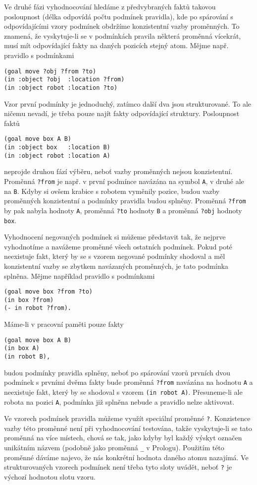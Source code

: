 Ve druhé fázi vyhodnocování hledáme z předvybraných faktů takovou posloupnost
(délka odpovídá počtu podmínek pravidla), kde po spárování s odpovídajícími
vzory podmínek obdržíme konzistentní vazby proměnných. To znamená, že
vyskytuje-li se v podmínkách pravila některá proměnná vícekrát, musí mít
odpovídající fakty na daných pozicích stejný atom.  Mějme např. pravidlo s
podmínkami
\begin{verbatim}
(goal move ?obj ?from ?to)
(in :object ?obj  :location ?from)
(in :object robot :location ?to)
\end{verbatim}
Vzor první podmínky je jednoduchý, zatímco další dva jsou strukturované. To ale
ničemu nevadí, je třeba pouze najít fakty odpovídající struktury. Posloupnost
faktů
\begin{verbatim}
(goal move box A B)
(in :object box   :location B)
(in :object robot :location A)
\end{verbatim}
neprojde druhou fází výběru, neboť vazby proměnných nejsou konzistentní.
Proměnná \verb|?from| je např. v první podmínce navázána na symbol \verb|A|, v
druhé ale na \verb|B|. Kdyby si ovšem krabice s robotem vyměnily pozice, budou
vazby proměnných konzistentní a podmínky pravidla budou splněny. Proměnná
\verb|?from| by pak nabyla hodnoty \verb|A|, proměnná \verb|?to| hodnoty
\verb|B| a proměnná \verb|?obj| hodnoty \verb|box|.

Vyhodnocení negovaných podmínek si můžeme představit tak, že nejprve vyhodnotíme
a navážeme proměnné všech ostatních podmínek. Pokud poté neexistuje fakt, který
by se s vzorem negované podmínky shodoval a měl konzistentní vazby se zbytkem navázaných
proměnných, je tato podmínka splněna. Mějme například pravidlo s podmínkami
\begin{verbatim}
(goal move box ?from ?to)
(in box ?from)
(- in robot ?from).
\end{verbatim}
Máme-li v pracovní paměti pouze fakty
\begin{verbatim}
(goal move box A B)
(in box A)
(in robot B),
\end{verbatim}
budou podmínky pravidla splněny, neboť po spárování vzorů prvních dvou podmínek
s prvními dvěma fakty bude proměnná \verb|?from| navázána na hodnotu \verb|A| a
neexistuje fakt, který by se shodoval s vzorem \verb|(in robot A)|. Přesuneme-li
ale robota na pozici \verb|A|, podmínka již splněna nebude a pravidlo nelze
aktivovat.

Ve vzorech podmínek pravidla můžeme využít speciální proměnné \verb|?|.
Konzistence vazby této proměnné není při vyhodnocování testována, takže
vyskytuje-li se tato proměnná na více místech, chová se tak, jako kdyby byl
každý výskyt označen unikátním názvem (podobně jako proměnná \verb|_| v
Prologu). Použitím této proměnné dáváme najevo, že nás konkrétní hodnota daného
atomu nazajímá. Ve strukturovaných vzorech podmínek není třeba tyto sloty uvádět,
neboť \verb|?| je výchozí hodnotou slotu vzoru.

